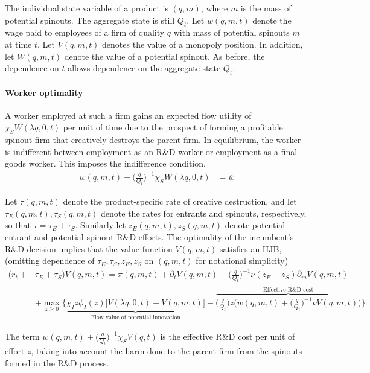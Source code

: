 \documentclass[11pt,english]{article}
\theoremstyle{remark}
\begin{document}
The individual state variable of a product is $(q,m)$, where $m$ is the mass of potential spinouts. The aggregate state is still $Q_t$. Let $w(q,m,t)$ denote the wage paid to employees of a firm of quality $q$ with mass of potential spinouts $m$ at time $t$. Let $V(q,m,t)$ denotes the value of a monopoly position. In addition, let $W(q,m,t)$ denote the value of a potential spinout. As before, the dependence on $t$ allows dependence on the aggregate state $Q_t$. 

\paragraph{Worker optimality}

A worker employed at such a firm gains an expected flow utility of $\chi_S W(\lambda q,0,t)$ per unit of time due to the prospect of forming a profitable spinout firm that creatively destroys the parent firm.  In equilibrium, the worker is indifferent between employment as an R\&D worker or employment as a final goods worker. This imposes the indifference condition,
\begin{align}
w(q,m,t) + \Big(\frac{q}{Q_t}\Big)^{-1} \chi_S W(\lambda q,0,t) &= \overline{w} \label{wage_rd}
\end{align}

Let $\tau(q,m,t)$ denote the product-specific rate of creative destruction, and let $\tau_E(q,m,t),\tau_S(q,m,t)$ denote the rates for entrants and spinouts, respectively, so that $\tau = \tau_E + \tau_S$. Similarly let $z_E(q,m,t),z_S(q,m,t)$ denote potential entrant and potential spinout R\&D efforts. The optimality of the incumbent's R\&D decision implies that the value function $V(q,m,t)$ satisfies an HJB, (omitting dependence of $\tau_E,\tau_S,z_E,z_S$ on $(q,m,t)$ for notational simplicity)
\begin{align}
(r_t +& \tau_E + \tau_S) V(q,m,t) = \pi(q,m,t) + \partial_tV(q,m,t) + \Big(\frac{q}{Q_t}\Big)^{-1} \nu (z_E + z_S) \partial_m V(q,m,t)\nonumber \\ 
&+ \max_{z \ge 0} \Big\{ \underbrace{\chi_I z\phi_I(z) \Big[V(\lambda q,0,t) - V(q,m,t) \Big]}_{\textrm{Flow value of potential innovation}} - \overbrace{\Big(\frac{q}{Q_t}\Big) z \Big(  w(q,m,t) + \Big(\frac{q}{Q_t}\Big)^{-1} \nu V(q,m,t) \Big)}^{\textrm{Effective R\&D cost}} \Big\} \label{HJB_I}
\end{align}

The term $w(q,m,t) + \Big(\frac{q}{Q_t}\Big)^{-1} \chi_S V(q,t)$ is the effective R\&D cost per unit of effort $z$, taking into account the harm done to the parent firm from the spinouts formed in the R\&D process. 
\end{document}
